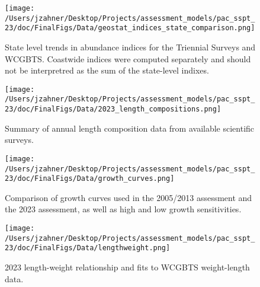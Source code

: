 \documentclass[11pt,
  letterpaper,
]{article}
\begin{document}
\begin{figure}
{\centering
\texttt{[image: /Users/jzahner/Desktop/Projects/assessment\_models/pac\_sspt\_23/doc/FinalFigs/Data/geostat\_indices\_state\_comparison.png]}
}
\caption{State level trends in abundance indices for the Triennial Surveys and WCGBTS. Coastwide indices were computed separately and should not be interpretred as the sum of the state-level indixes.\label{fig:state_indices}}
\end{figure}

\begin{figure}
{\centering
\texttt{[image: /Users/jzahner/Desktop/Projects/assessment\_models/pac\_sspt\_23/doc/FinalFigs/Data/2023\_length\_compositions.png]}
}
\caption{Summary of annual length composition data from available scientific surveys.\label{fig:survey_comps}}
\end{figure}

\begin{figure}
{\centering
\texttt{[image: /Users/jzahner/Desktop/Projects/assessment\_models/pac\_sspt\_23/doc/FinalFigs/Data/growth\_curves.png]}
}
\caption{Comparison of growth curves used in the 2005/2013 assessment and the 2023 assessment, as well as high and low growth sensitivities.\label{fig:growthcurve}}
\end{figure}

\begin{figure}
{\centering
\texttt{[image: /Users/jzahner/Desktop/Projects/assessment\_models/pac\_sspt\_23/doc/FinalFigs/Data/lengthweight.png]}
}
\caption{2023 length-weight relationship and fits to WCGBTS weight-length data.\label{fig:lengthweight}}
\end{figure}
\end{document}
